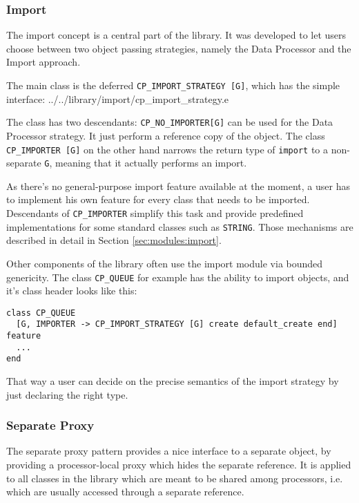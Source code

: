 \documentclass[a4paper,10pt]{article}
\newcommand{\todoref}{\todo{ref}}
\begin{document}
\subsubsection{Import}
\label{sec:concepts:import}

The import concept is a central part of the library.
It was developed to let users choose between two object passing strategies, namely the Data Processor \todoref and the Import \todoref approach.

The main class is the deferred \lstinline!CP_IMPORT_STRATEGY [G]!, which has the simple interface:
 {../../library/import/cp_import_strategy.e}

The class has two descendants: \lstinline!CP_NO_IMPORTER[G]! can be used for the Data Processor strategy. 
It just perform a reference copy of the object.
The class \lstinline!CP_IMPORTER [G]! on the other hand narrows the return type of \lstinline!import! to a non-separate \lstinline!G!, meaning that it actually performs an import.

As there's no general-purpose import feature available at the moment, a user has to implement his own feature for every class that needs to be imported.
Descendants of \lstinline!CP_IMPORTER! simplify this task and provide predefined implementations for some standard classes such as \lstinline!STRING!.
Those mechanisms are described in detail in Section \ref{sec:modules:import}.

Other components of the library often use the import module via bounded genericity.
The class \lstinline!CP_QUEUE! for example has the ability to import objects, and it's class header looks like this:
\begin{lstlisting}
class CP_QUEUE
  [G, IMPORTER -> CP_IMPORT_STRATEGY [G] create default_create end]
feature
  ...
end
\end{lstlisting}
That way a user can decide on the precise semantics of the import strategy by just declaring the right type.



\subsubsection{Separate Proxy}

The separate proxy pattern provides a nice interface to a separate object, by providing a processor-local proxy which hides the separate reference.
It is applied to all classes in the library which are meant to be shared among processors, i.e. which are usually accessed through a separate reference.
\end{document}
